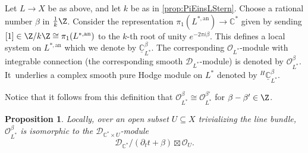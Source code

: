 \documentclass[JEP,XML,SOM,Unicode,published]{cedram}
\let\mathds\mathbb
\newtheorem{prop}[thm]{Proposition}
\newcommand{\dC}{{\mathds C}}\let\C\dC
\newcommand{\cD}{\mathscr{D}}
\newcommand{\cO}{\mathcal{O}}\let\O\cO
\begin{document}
\begin{dfn}\label{def:Obeta-new}
Let $L\to X$ be as above, and let $k$ be as in \cref{prop:PiEinsLStern}.
Choose a rational number $\beta$ in $\frac{1}{k}\Z$. Consider the representation $\pi_1(L^{*,\mathrm{an}}) \to \dC^*$ given by sending $[1]\in\Z/k\Z \cong\pi_1(L^{*,\mathrm{an}})$ to the $k$-th root of unity
$e^{-2\pi i \beta}$. This defines a local system on $L^{*,\mathrm{an}}$ which we denote by $\underline{\dC}^\beta_{L^*}$. The corresponding $\cO_{L^*}$\nobreakdash-mod\-ule with integrable connection
(\ie the corresponding smooth $\cD_{L^*}$\nobreakdash-mod\-ule) is denoted
by $\cO_{L^*}^\beta$. It~underlies a complex smooth pure Hodge module on $L^*$ denoted by $^{H\!}\underline{\dC}^\beta_{L^*}$.
\end{dfn}
Notice that it follows from this definition that $\cO_{L^*}^\beta\cong \cO_{L^*}^{\beta'}$ for $\beta-\beta'\in \Z$.

\begin{prop}\label{prop:ObetaExtProd}
Locally, over an open subset $U \subseteq X$ trivializing the line bundle, $\O_{L^*}^\beta$ is isomorphic to the $\mathscr D_{\C^* \times U}$\nobreakdash-mod\-ule
\[
\mathscr D_{\C^*}/(\partial_t t + \beta) \boxtimes \O_U.
\]
\end{prop}
\end{document}

